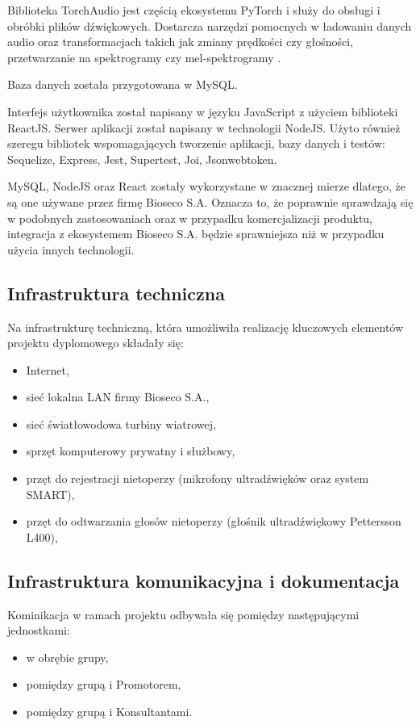 \documentclass{sprz}
\begin{document}
Biblioteka TorchAudio jest częścią ekosystemu PyTorch i służy do obsługi i obróbki plików dźwiękowych. Dostarcza narzędzi pomocnych w ładowaniu danych audio oraz transformacjach takich jak zmiany prędkości czy głośności, przetwarzanie na spektrogramy czy mel-spektrogramy \cite{torchaudio}.

Baza danych została przygotowana w MySQL.

Interfejs użytkownika został napisany w języku JavaScript z użyciem biblioteki ReactJS. Serwer aplikacji został napisany w technologii NodeJS. Użyto również szeregu bibliotek wspomagających tworzenie aplikacji, bazy danych i testów: Sequelize, Express, Jest, Supertest, Joi, Jsonwebtoken. 

MySQL, NodeJS oraz React zostały wykorzystane w znacznej mierze dlatego, że są one używane przez firmę Bioseco S.A. Oznacza to, że poprawnie sprawdzają się w podobnych zastosowaniach oraz w przypadku komercjalizacji produktu, integracja z ekosystemem Bioseco S.A. będzie sprawniejsza niż w przypadku użycia innych technologii.

\subsection{Infrastruktura techniczna}
Na infrastrukturę techniczną, która umożliwiła realizację kluczowych elementów projektu dyplomowego składały się:
\begin{itemize}
  \item{Internet,}
  \item{sieć lokalna LAN firmy Bioseco S.A.,}
  \item{sieć światłowodowa turbiny wiatrowej,}
  \item{sprzęt komputerowy prywatny i służbowy,}
  \item{przęt do rejestracji nietoperzy (mikrofony ultradźwięków oraz system SMART),}
  \item{przęt do odtwarzania głosów nietoperzy (głośnik ultradźwiękowy Pettersson L400),}
  \end{itemize}

\subsection{Infrastruktura komunikacyjna i dokumentacja}
Kominikacja w ramach projektu odbywała się pomiędzy następującymi jednostkami:
\begin{itemize}
  \item{w obrębie grupy,}
  \item{pomiędzy grupą i Promotorem,}
  \item{pomiędzy grupą i Konsultantami.}
  \end{itemize}
\end{document}
